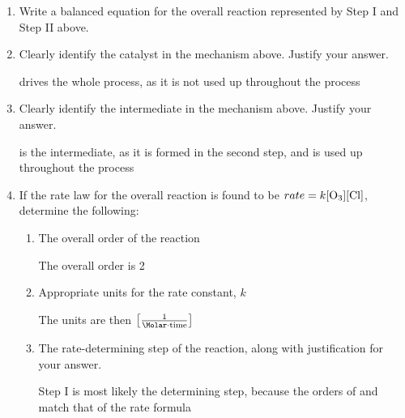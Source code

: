 \documentclass[12pt]{article}
\begin{document}
\begin{enumerate}
    \begin{enumerate}

      \item Write a balanced equation for the overall reaction represented by Step I and Step II above.

        \begin{center}
        \end{center}

      \item Clearly identify the catalyst in the mechanism above. Justify your answer.

        \begin{center}
           drives the whole process, as it is not used up throughout the process
        \end{center}

      \item Clearly identify the intermediate in the mechanism above. Justify your answer.

        \begin{center}
           is the intermediate, as it is formed in the second step, and is used up throughout the process
        \end{center}

      \item If the rate law for the overall reaction is found to be $rate=k[\ce{O3}][\ce{Cl}]$, determine the following: 

        \begin{enumerate}

          \item The overall order of the reaction

            \begin{center}
              The overall order is 2
            \end{center}

          \item Appropriate units for the rate constant, $k$

            \begin{center}
            The units are then $\left[ \frac{1}{\si{\Molar\cdot time}} \right]$
            \end{center}

          \item The rate-determining step of the reaction, along with justification for your answer.

        \begin{center}
          Step I is most likely the determining step, because the orders of  and  match that of the rate formula
        \end{center}

        \end{enumerate}

    \end{enumerate}

\end{enumerate}
\end{document}
